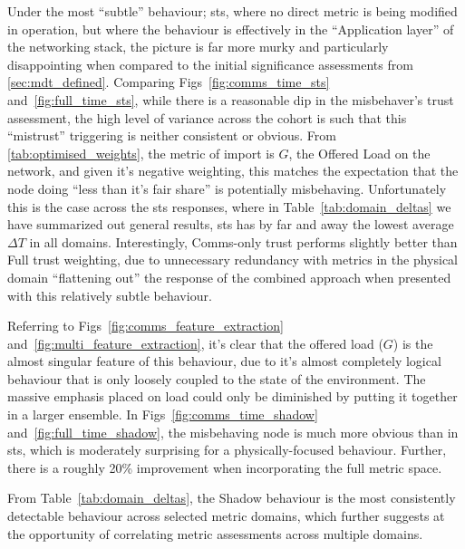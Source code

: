 Under the most ``subtle'' behaviour; \gls{sts}, where no direct metric is being modified in operation, but where the behaviour is effectively in the ``Application layer'' of the networking stack, the picture is far more murky and particularly disappointing when compared to the initial significance assessments from \autoref{sec:mdt_defined}. 
Comparing Figs~\ref{fig:comms_time_sts} and~\ref{fig:full_time_sts}, while there is a reasonable dip in the misbehaver’s trust assessment, the high level of variance across the cohort is such that this ``mistrust'' triggering is neither consistent or obvious. 
From \autoref{tab:optimised_weights}, the metric of import is $G$, the Offered Load on the network, and given it's negative weighting, this matches the expectation that the node doing ``less than it's fair share'' is potentially misbehaving. 
Unfortunately this is the case across the \gls{sts} responses, where in Table~\ref{tab:domain_deltas} we have summarized out general results, \gls{sts} has by far and away the lowest average $\Delta T$ in all domains. 
Interestingly, Comms-only trust performs slightly better than Full trust weighting, due to unnecessary redundancy with metrics in the physical domain ``flattening out'' the response of the combined approach when presented with this relatively subtle behaviour.

Referring to Figs~\ref{fig:comms_feature_extraction} and~\autoref{fig:multi_feature_extraction}, it's clear that the offered load ($G$) is the almost singular feature of this behaviour, due to it's almost completely logical behaviour that is only loosely coupled to the state of the environment. 
The massive emphasis placed on load could only be diminished by putting it together in a larger ensemble.
In Figs~\ref{fig:comms_time_shadow} and~\ref{fig:full_time_shadow}, the misbehaving node is much more obvious than in \gls{sts}, which is moderately surprising for a physically-focused behaviour. Further, there is a roughly 20\% improvement when incorporating the full metric space.

From Table~\ref{tab:domain_deltas}, the Shadow behaviour is the most consistently detectable behaviour across selected metric domains, which further suggests at the opportunity of correlating metric assessments across multiple domains.




